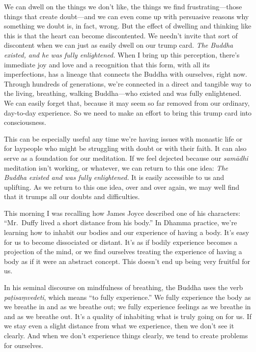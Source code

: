 We can dwell on the things we don't like, the things we find 
frustrating---those things that create doubt---and we can even come up 
with persuasive reasons why something we doubt is, in fact, wrong. But 
the effect of dwelling and thinking like this is that the heart can 
become discontented. We needn't invite that sort of discontent when we 
can just as easily dwell on our trump card. \emph{The Buddha existed, 
and he was fully enlightened.} When I bring up this perception, there's 
immediate joy and love and a recognition that this form, with all its 
imperfections, has a lineage that connects the Buddha with ourselves, 
right now. Through hundreds of generations, we're connected in a direct 
and tangible way to the living, breathing, walking Buddha---who existed 
and was fully enlightened. We can easily forget that, because it may 
seem so far removed from our ordinary, day-to-day experience. So we 
need to make an effort to bring this trump card into consciousness.

This can be especially useful any time we're having issues with 
monastic life or for laypeople who might be struggling with doubt or 
with their faith. It can also serve as a foundation for our meditation. 
If we feel dejected because our \emph{samādhi} meditation isn't 
working, or whatever, we can return to this one idea: \emph{The Buddha 
existed and was fully enlightened.} It is easily accessible to us and 
uplifting. As we return to this one idea, over and over again, we may 
well find that it trumps all our doubts and difficulties.


This morning I was recalling how James Joyce described one of his 
characters: ``Mr. Duffy lived a short distance from his body.'' In 
Dhamma practice, we're learning how to inhabit our bodies and our 
experience of having a body. It's easy for us to become dissociated or 
distant. It's as if bodily experience becomes a projection of the mind, 
or we find ourselves treating the experience of having a body as if it 
were an abstract concept. This doesn't end up being very fruitful for 
us.

In his seminal discourse on mindfulness of breathing, the Buddha uses 
the verb \emph{paṭisaṃvedeti}, which means ``to fully experience.'' 
We fully experience the body as we breathe in and as we breathe out; we 
fully experience feelings as we breathe in and as we breathe out. It's 
a quality of inhabiting what is truly going on for us. If we stay even 
a slight distance from what we experience, then we don't see it 
clearly. And when we don't experience things clearly, we tend to create 
problems for ourselves.

